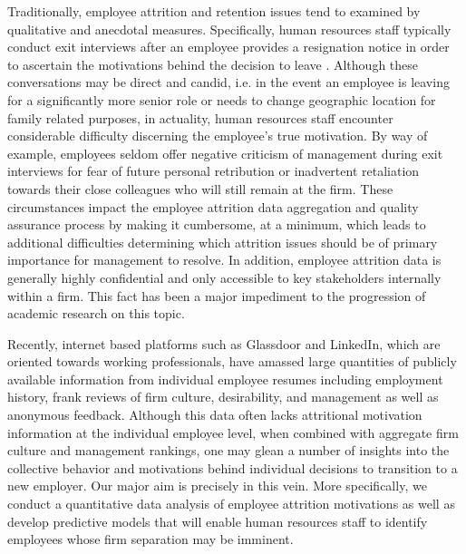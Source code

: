 \documentclass[10pt]{article}
\begin{document}
Traditionally, employee attrition and retention issues tend to examined by qualitative and anecdotal 
measures.  Specifically, human resources staff typically conduct exit interviews after an employee provides 
a resignation notice in order to ascertain the motivations behind the decision to leave \cite{Giac1991}.  Although 
these conversations may be direct and candid, i.e. in the event an employee is leaving for a significantly 
more senior role or needs to change geographic location for family related purposes, in actuality, human resources staff
encounter considerable difficulty discerning the employee's true motivation.  By way of example, employees 
seldom offer negative criticism of management during exit interviews for fear of future personal retribution 
or inadvertent retaliation towards their close colleagues who will still remain at the firm.
These circumstances impact the employee attrition data aggregation and quality assurance process 
by making it cumbersome, at a minimum, which leads to additional difficulties determining which 
attrition issues should be of primary importance for management to resolve. In addition, employee 
attrition data is generally highly confidential and only accessible to key stakeholders internally 
within a firm.  This fact has been a major impediment to the progression of academic research on 
this topic. 

Recently, internet based platforms such as Glassdoor and LinkedIn, which are oriented towards working 
professionals, have amassed large quantities of publicly available information from individual 
employee resumes including employment history, frank reviews of firm culture, desirability, and management
as well as anonymous feedback.  Although this data often lacks attritional motivation information at 
the individual employee level, when combined with aggregate firm culture and management rankings, 
one may glean a number of insights into the collective behavior and motivations behind individual 
decisions to transition to a new employer. Our major aim is precisely in this vein.  More specifically, 
we conduct a quantitative data analysis of employee attrition motivations as well as develop 
predictive models that will enable human resources staff to identify employees whose firm separation 
may be imminent.
\end{document}
